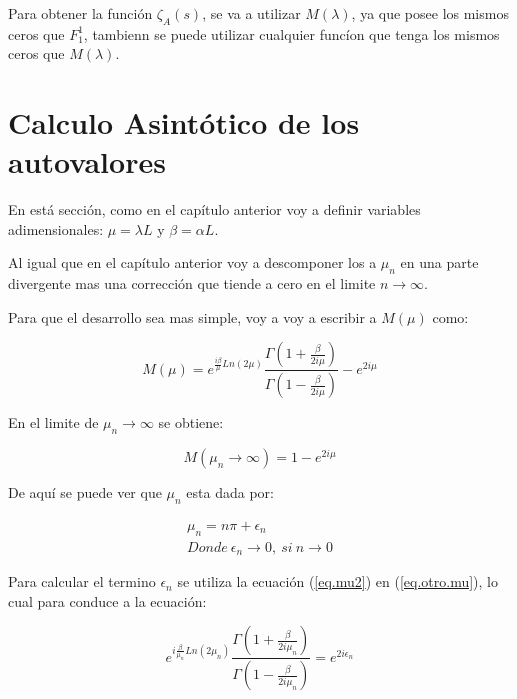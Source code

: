 Para obtener la función $\zeta _A (s) $, se va a utilizar $M( \lambda)$, ya que posee los mismos ceros que $F _1 ^1$, tambienn se puede utilizar cualquier funcíon que tenga los mismos ceros que $M ( \lambda )$.





\section{Calculo Asintótico de los autovalores}


En está sección, como en el capítulo anterior voy a definir variables adimensionales: $\mu = \lambda L $ y $\beta = \alpha L$.

Al igual que en el capítulo anterior voy a descomponer los a $\mu _n$ en una parte divergente mas una corrección que tiende a cero en el limite $n \rightarrow \infty$.

Para que el desarrollo sea mas simple, voy a voy a escribir a $M (\mu)$ como:

\begin{equation}
M (\mu) = e ^{\frac{i \beta }{\mu} Ln(2 \mu) }
\frac{\Gamma (1 + \frac{ \beta}{2 i \mu})}{\Gamma (1 - \frac{ \beta}{2 i \mu})}
- e ^{2 i \mu}
\label{eq.otro.mu}
\end{equation}


En el limite de $\mu _n \rightarrow \infty$ se obtiene:

\begin{equation}
    M(\mu _n \rightarrow \infty) = 
	1 - e ^{2 i \mu}
\end{equation}

De aquí se puede ver que $\mu _n$ esta dada por:


\begin{equation}
\begin{array}{c}
    \mu _n = n \pi + \epsilon _n \\[5pt]
    Donde \ \epsilon _n \rightarrow{0} ,\ si \ n \rightarrow{0}
\end{array}
\label{eq.mu2}
\end{equation}



Para calcular el termino $\epsilon _n$ se utiliza la ecuación (\ref{eq.mu2}) en (\ref{eq.otro.mu}), lo cual para conduce a la ecuación:

\begin{equation}
	e ^{ i \frac{\beta}{ \mu _n} Ln(2 \mu _n)}     
    \frac{\Gamma(1 + \frac{ \beta}{2  i \mu _n} ) }
    {\Gamma(1 -  \frac{ \beta}{2  i \mu _n} )} =    
    e ^{2 i \epsilon _n }
\end{equation}

